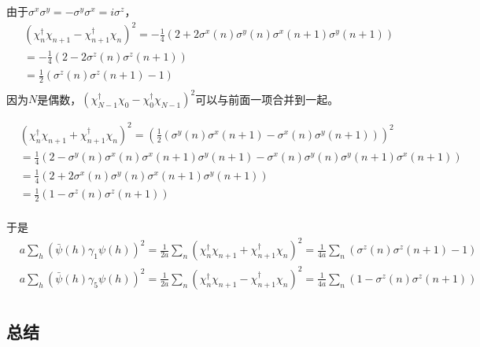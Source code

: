 由于$\sigma ^x\sigma ^y = -\sigma ^y\sigma ^x = i \sigma ^z$，
\begin{equation}
\begin{split}
&\left(\chi^{\dagger}_n\chi_{n+1}-\chi^{\dagger}_{n+1}\chi _n\right)^2 = -\frac{1}{4}\left(2+2\sigma ^x(n)\sigma ^y(n)\sigma ^x(n+1)\sigma ^y(n+1)\right)\\
&= -\frac{1}{4}\left(2-2\sigma ^z(n)\sigma ^z(n+1)\right)\\
&=\frac{1}{2}\left(\sigma ^z(n)\sigma ^z(n+1)-1\right)\\
\end{split}
\end{equation}
因为$N$是偶数，$\left(\chi^{\dagger}_{N-1}\chi_{0}-\chi^{\dagger}_{0}\chi _{N-1}\right)^2$可以与前面一项合并到一起。

\begin{equation}
\begin{split}
&\left(\chi^{\dagger}_n\chi_{n+1}+\chi^{\dagger}_{n+1}\chi _n\right)^2 = \left(\frac{1}{2}\left(\sigma ^y(n)\sigma ^x(n+1)-\sigma ^x(n)\sigma ^y(n+1)\right)\right)^2\\
&=\frac{1}{4}\left(2-\sigma ^y(n)\sigma ^x(n)\sigma ^x(n+1)\sigma ^y(n+1)-\sigma ^x(n)\sigma ^y(n)\sigma ^y(n+1)\sigma ^x(n+1)\right)\\
&=\frac{1}{4}\left(2+2\sigma ^x(n)\sigma ^y(n)\sigma ^x(n+1)\sigma ^y(n+1)\right)\\
&=\frac{1}{2}\left(1-\sigma ^z(n)\sigma ^z(n+1)\right)\\
\end{split}
\end{equation}

于是
\begin{equation}
\begin{split}
&a\sum _h (\bar{\psi}(h) \gamma _1 \psi(h) )^2=\frac{1}{2a}\sum _n \left(\chi^{\dagger}_{n}\chi_{n+1}+\chi^{\dagger}_{n+1}\chi_{n}\right)^2=\frac{1}{4a}\sum _n \left(\sigma^z(n)\sigma^z(n+1)-1\right)\\
&a\sum _h (\bar{\psi}(h) \gamma _5 \psi(h) )^2=\frac{1}{2a}\sum _n \left(\chi^{\dagger}_{n}\chi_{n+1}-\chi^{\dagger}_{n+1}\chi_{n}\right)^2=\frac{1}{4a}\sum _n \left(1-\sigma^z(n)\sigma^z(n+1)\right)\\
\end{split}
\end{equation}

\subsection{总结}


